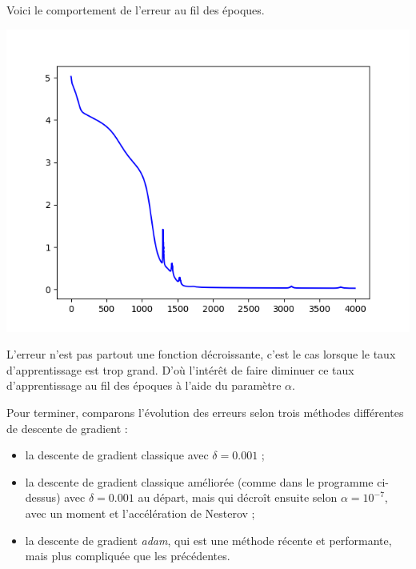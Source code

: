 \documentclass[11pt,class=report,crop=false]{standalone}
\begin{document}
Voici le comportement de l'erreur au fil des époques.
\begin{center}
\includegraphics[scale=\myscale,scale=0.5]{figures/unevar-fonction-erreur}
\end{center}

L'erreur n'est pas partout une fonction décroissante, c'est le cas lorsque le taux d'apprentissage est trop grand. D'où l'intérêt de faire diminuer ce taux d'apprentissage au fil des époques à l'aide du paramètre $\alpha$.

Pour terminer, comparons l'évolution des erreurs selon trois méthodes différentes de descente de gradient :
\begin{itemize}
  \item la descente de gradient classique avec $\delta = 0.001$ ;
  \item la descente de gradient classique  améliorée (comme dans le programme ci-dessus) avec $\delta = 0.001$ au départ, mais qui décroît ensuite selon $\alpha = 10^{-7}$, avec un moment et l'accélération de Nesterov ;
  \item la descente de gradient \og{}\emph{adam}\fg{}, qui est une méthode récente et performante, mais plus compliquée que les précédentes.
\end{itemize}
\end{document}
